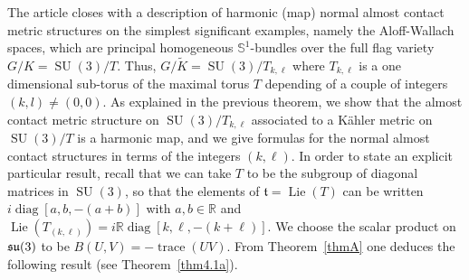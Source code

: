 \documentclass[a4paper,reqno]{amsart}
\theoremstyle{definition}
\theoremstyle{remark}
\theoremstyle{plain}
\numberwithin{equation}{section}
\newcommand{\R}{{\mathbb{R}}}
\newcommand{\bbS}{{\mathbb{S}}}
\newcommand{\ft}{{\mathfrak{t}}}
\def\Lie{\operatorname {Lie}}
\def\SU{\operatorname {SU}}
\def\diag{\operatorname {diag}}
\DeclareMathOperator{\trace}{{trace}}
\newcommand{\wK}{{\widetilde{K}}}
\begin{document}

The article closes with a description of harmonic (map) normal
almost contact metric structures on the simplest significant
examples, namely the Aloff-Wallach spaces, which are principal
homogeneous $\bbS^1$-bundles over the full flag variety
$G/K=\SU(3)/T$.  Thus, $G/\wK= \SU(3)/T_{k,\ell}$ where
$T_{k,\ell}$ is a one dimensional sub-torus of the maximal torus
$T$ depending of a couple of integers $(k,l)\neq (0,0)$. As
explained in the previous theorem, we show
that the almost contact metric structure on
$\SU(3)/T_{k,\ell}$ associated to a K\"ahler metric on $\SU(3)/T$
is a harmonic map, and we give formulas for the normal almost
contact structures in terms of the integers $(k,\ell)$. In order to state
an explicit particular result, recall that we can take $T$ to be the subgroup of
diagonal matrices in $\SU(3)$, so that the elements of $\ft = \Lie(T)$ can be
written $i\diag[a,b,-(a+b)]$ with $a,b \in \R$ and
$\Lie(T_{(k,\ell)})= i\R\diag[k,\ell,-(k+\ell)]
$. We choose the 
scalar product on ${\mathfrak{su}}(3)$ to be $B(U,V)= - \trace(UV)$. From
Theorem~\ref{thmA}  one deduces  the following
result (see Theorem~\ref{thm4.1a}).
\end{document}
